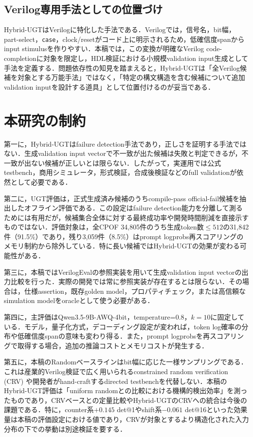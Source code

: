 \documentclass[submit,techrep,noauthor]{ipsj}
\begin{document}
\subsection{Verilog専用手法としての位置づけ}

Hybrid-UGTはVerilogに特化した手法である．Verilogでは，信号名，bit幅，part-select，\texttt{case}，clock/resetがコード上に明示されるため，低確信度spanからinput stimulusを作りやすい．本稿では，この変換が明確なVerilog code-completionに対象を限定し，HDL検証における小規模validation input生成として手法を定義する．問題依存性の知見を踏まえると，Hybrid-UGTは「全Verilog候補を対象とする万能手法」ではなく，「特定の構文構造を含む候補について追加validation inputを設計する道具」として位置付けるのが妥当である．


\section{本研究の制約}

第一に，Hybrid-UGTはfailure detection手法であり，正しさを証明する手法ではない．生成validation input vectorで不一致が出た候補は失敗と判定できるが，不一致が出ない候補が正しいとは限らない．したがって，実運用では公式testbench，商用シミュレータ，形式検証，合成後検証などのfull validationが依然として必要である．

第二に，UGT評価は，正式生成済み候補のうちcompile-pass official-fail候補を抽出したオフライン評価である．この設定はfailure detection能力を分離して測るためには有用だが，候補集合全体に対する最終成功率や開発時間削減を直接示すものではない．評価対象は，全CPOF 34,805件のうち生成token数$\le512$の31,842件（91.5\%）であり，残り3,059件（8.5\%）はprompt logprobs再スコアリングのメモリ制約から除外している．特に長い候補ではHybrid-UGTの効果が変わる可能性がある．

第三に，本稿ではVerilogEvalの参照実装を用いて生成validation input vectorの出力比較を行った．実際の開発では常に参照実装が存在するとは限らない．その場合は，仕様assertion，既存golden model，プロパティチェック，または高信頼なsimulation modelをoracleとして使う必要がある．

第四に，主評価はQwen3.5-9B-AWQ-4bit，temperature=0.8，$k=10$に固定している．モデル，量子化方式，デコーディング設定が変われば，token log確率の分布や低確信度spanの意味も変わり得る．また，prompt logprobsを再スコアリングで取得する場合，追加の推論コストとメモリコストが発生する．

第五に，本稿のRandomベースラインはbit幅に応じた一様サンプリングである．これは産業的Verilog検証で広く用いられるconstrained random verification (CRV) や開発者がhand-craftするdirected testbenchを代替しない．本稿のHybrid-UGT評価は「uniform randomとの比較における機構的検出効率」を測ったものであり，CRVベースとの定量比較やHybrid-UGTのCRVへの統合は今後の課題である．特に，counter系$+0.145$ det@1やshift系$-0.061$ det@16といった効果量は本稿の評価設定における値であり，CRVが対象とするより構造化された入力分布の下での挙動は別途検証を要する．
\end{document}
